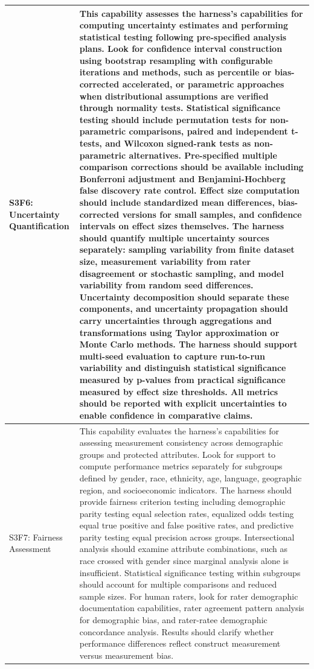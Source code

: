 \begin{longtable}{>{\raggedright\arraybackslash}p{3cm}|>{\raggedright\arraybackslash}p{16cm}}
S3F6: Uncertainty Quantification & This capability assesses the harness's capabilities for computing uncertainty estimates and performing statistical testing following pre-specified analysis plans. Look for confidence interval construction using bootstrap resampling with configurable iterations and methods, such as percentile or bias-corrected accelerated, or parametric approaches when distributional assumptions are verified through normality tests. Statistical significance testing should include permutation tests for non-parametric comparisons, paired and independent t-tests, and Wilcoxon signed-rank tests as non-parametric alternatives. Pre-specified multiple comparison corrections should be available including Bonferroni adjustment and Benjamini-Hochberg false discovery rate control. Effect size computation should include standardized mean differences, bias-corrected versions for small samples, and confidence intervals on effect sizes themselves. The harness should quantify multiple uncertainty sources separately: sampling variability from finite dataset size, measurement variability from rater disagreement or stochastic sampling, and model variability from random seed differences. Uncertainty decomposition should separate these components, and uncertainty propagation should carry uncertainties through aggregations and transformations using Taylor approximation or Monte Carlo methods. The harness should support multi-seed evaluation to capture run-to-run variability and distinguish statistical significance measured by p-values from practical significance measured by effect size thresholds. All metrics should be reported with explicit uncertainties to enable confidence in comparative claims. \\
\hline

S3F7: Fairness Assessment & This capability evaluates the harness's capabilities for assessing measurement consistency across demographic groups and protected attributes. Look for support to compute performance metrics separately for subgroups defined by gender, race, ethnicity, age, language, geographic region, and socioeconomic indicators. The harness should provide fairness criterion testing including demographic parity testing equal selection rates, equalized odds testing equal true positive and false positive rates, and predictive parity testing equal precision across groups. Intersectional analysis should examine attribute combinations, such as race crossed with gender since marginal analysis alone is insufficient. Statistical significance testing within subgroups should account for multiple comparisons and reduced sample sizes. For human raters, look for rater demographic documentation capabilities, rater agreement pattern analysis for demographic bias, and rater-ratee demographic concordance analysis. Results should clarify whether performance differences reflect construct measurement versus measurement bias. \\
\hline


\end{longtable}
